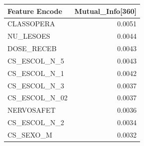\begin{tabular}{lr}
\toprule
Feature Encode & Mutual\_Info[360] \\
\midrule
CLASSOPERA & 0.0051 \\
NU\_LESOES & 0.0044 \\
DOSE\_RECEB & 0.0043 \\
CS\_ESCOL\_N\_5 & 0.0043 \\
CS\_ESCOL\_N\_1 & 0.0042 \\
CS\_ESCOL\_N\_3 & 0.0037 \\
CS\_ESCOL\_N\_02 & 0.0037 \\
NERVOSAFET & 0.0036 \\
CS\_ESCOL\_N\_2 & 0.0034 \\
CS\_SEXO\_M & 0.0032 \\
\bottomrule
\end{tabular}
